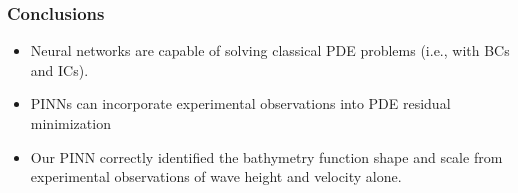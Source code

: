 \begin{frame}
    \frametitle{Conclusions}

    \begin{itemize}[<+->]
        \setlength\itemsep{2em}
        \item Neural networks are capable of solving classical PDE problems (i.e., with BCs and ICs).
        \item PINNs can incorporate experimental observations into PDE residual minimization
        \item Our PINN correctly identified the bathymetry function shape and scale from experimental observations of 
              wave height and velocity alone.
    \end{itemize}
\end{frame}